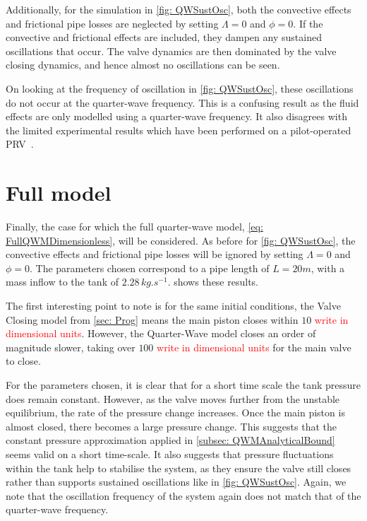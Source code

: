 Additionally, for the simulation in \cref{fig: QWSustOsc}, both the convective effects and frictional pipe losses are neglected by setting $\Lambda = 0$ and $\phi = 0$. If the convective and frictional effects are included, they dampen any sustained oscillations that occur. The valve dynamics are then dominated by the valve closing dynamics, and hence almost no oscillations can be seen.

On looking at the frequency of oscillation in \cref{fig: QWSustOsc}, these oscillations do not occur at the quarter-wave frequency. This is a confusing result as the fluid effects are only modelled using a quarter-wave frequency. It also disagrees with the limited experimental results which have been performed on a pilot-operated PRV~\cite{Allison2015TestingValves}.

\section{Full model}

Finally, the case for which the full quarter-wave model, \cref{eq: FullQWMDimensionless}, will be considered. As before for \cref{fig: QWSustOsc}, the convective effects and frictional pipe losses will be ignored by setting $\Lambda = 0$ and $\phi = 0$. The parameters chosen correspond to a pipe length of $L = 20 \si{m}$, with a mass inflow to the tank of $2.28 \, \si{kg.s^{-1}}$.  shows these results.
~


The first interesting point to note is for the same initial conditions, the Valve Closing model from \cref{sec: Prog} means the main piston closes within $10$ \textcolor{Red}{write in dimensional units}. However, the Quarter-Wave model closes an order of magnitude slower, taking over $100$ \textcolor{Red}{write in dimensional units} for the main valve to close.

For the parameters chosen, it is clear that for a short time scale the tank pressure does remain constant. However, as the valve moves further from the unstable equilibrium, the rate of the pressure change increases. Once the main piston is almost closed, there becomes a large pressure change. This suggests that the constant pressure approximation applied in \cref{subsec: QWMAnalyticalBound} seems valid on a short time-scale. It also suggests that pressure fluctuations within the tank help to stabilise the system, as they ensure the valve still closes rather than supports sustained oscillations like in \cref{fig: QWSustOsc}. Again, we note that the oscillation frequency of the system again does not match that of the quarter-wave frequency.

